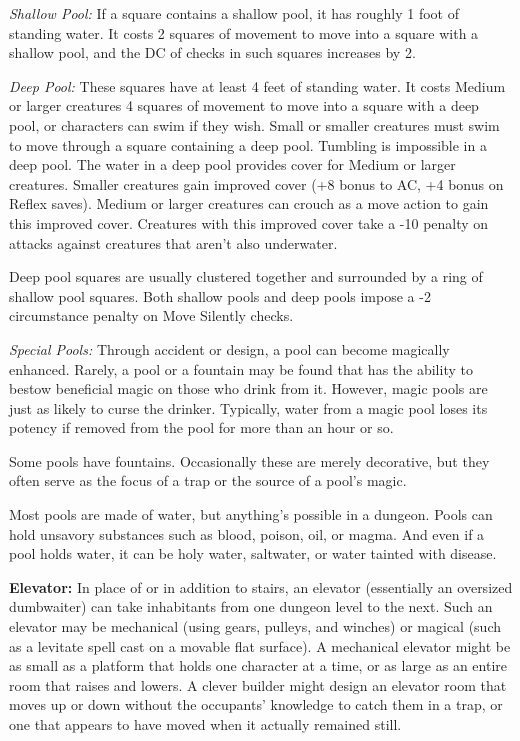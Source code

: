 \textit{Shallow Pool:} If a square contains a shallow pool, it has roughly 1 foot of standing water. It costs 2 squares of movement to move into a square with a shallow pool, and the DC of  checks in such squares increases by 2.

\textit{Deep Pool:} These squares have at least 4 feet of standing water. It costs Medium or larger creatures 4 squares of movement to move into a square with a deep pool, or characters can swim if they wish. Small or smaller creatures must swim to move through a square containing a deep pool. Tumbling is impossible in a deep pool. The water in a deep pool provides cover for Medium or larger creatures. Smaller creatures gain improved cover (+8 bonus to AC, +4 bonus on Reflex saves). Medium or larger creatures can crouch as a move action to gain this improved cover. Creatures with this improved cover take a -10 penalty on attacks against creatures that aren't also underwater.

Deep pool squares are usually clustered together and surrounded by a ring of shallow pool squares. Both shallow pools and deep pools impose a -2 circumstance penalty on Move Silently checks.

\textit{Special Pools:} Through accident or design, a pool can become magically enhanced. Rarely, a pool or a fountain may be found that has the ability to bestow beneficial magic on those who drink from it. However, magic pools are just as likely to curse the drinker. Typically, water from a magic pool loses its potency if removed from the pool for more than an hour or so.

Some pools have fountains. Occasionally these are merely decorative, but they often serve as the focus of a trap or the source of a pool's magic.

Most pools are made of water, but anything's possible in a dungeon. Pools can hold unsavory substances such as blood, poison, oil, or magma. And even if a pool holds water, it can be holy water, saltwater, or water tainted with disease.

\textbf{Elevator:} In place of or in addition to stairs, an elevator (essentially an oversized dumbwaiter) can take inhabitants from one dungeon level to the next. Such an elevator may be mechanical (using gears, pulleys, and winches) or magical (such as a levitate spell cast on a movable flat surface). A mechanical elevator might be as small as a platform that holds one character at a time, or as large as an entire room that raises and lowers. A clever builder might design an elevator room that moves up or down without the occupants' knowledge to catch them in a trap, or one that appears to have moved when it actually remained still.

